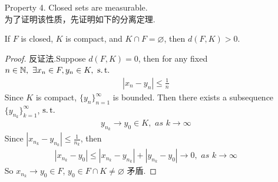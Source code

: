 \begin{enumerate}
		\vspace{2em}
		\item[Property 4.]Closed sets are measurable.\\
		为了证明该性质，先证明如下的分离定理.
		\begin{lemma}\label{lemma 1.3.1}
			If $F$ is closed, $K$ is compact, and $K \cap F = \varnothing$, then $d(F , K) >0$.
			
			\vspace{1em}
			\begin{proof}
				反证法.Suppose $d(F , K) = 0$, then for any fixed $n \in \mathbb{N} , \,\, \exists x_n \in F , y_n \in K , \,\, \operatorname{s.t.}$
				\begin{align}
					\left| x_n - y_n \right| \leq \frac{1}{n}
				\end{align}
				Since $K$ is compact, $\{ y_n \}_{n = 1}^{\infty}$ is bounded. Then there exists a subsequence $\{ y_{n_k} \}_{k = 1}^{\infty}$, $\operatorname{s.t.}$
				\begin{align}
					y_{n_k} \to y_0 \in K , \,\, as \,\, k \to \infty
				\end{align}
				Since $\left| x_{n_k} - y_{n_k} \right| \leq \frac{1}{n_k}$, then
				\begin{align}
					\left| x_{n_k} - y_0 \right| \leq \left| x_{n_k} - y_{n_k} \right| + \left| y_{n_k} - y_0 \right| \to 0 , \,\, as \,\, k \to \infty
				\end{align}
				So $x_{n_k} \to y_0 \in F$, $y_0 \in F \cap K \neq \varnothing$ 矛盾.
			\end{proof}
		\end{lemma}
	

\end{enumerate}
